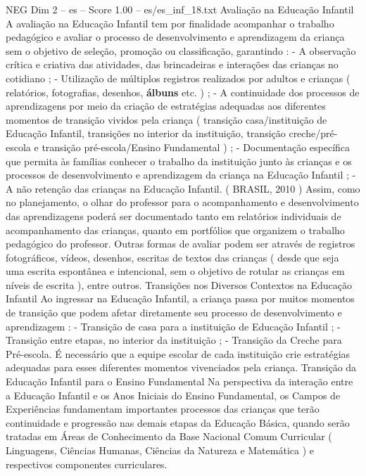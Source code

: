 \begin{textsample}{NEG Dim 2 – es – Score 1.00 – es/es\_inf\_18.txt}  \label{ex:f2_neg_080}
Avaliação na Educação Infantil A avaliação na Educação Infantil tem por finalidade acompanhar o trabalho pedagógico e avaliar o processo de desenvolvimento e aprendizagem da criança sem o objetivo de seleção, promoção ou classificação, garantindo : - A observação crítica e criativa das atividades, das brincadeiras e interações das crianças no cotidiano ; - Utilização de múltiplos registros realizados por adultos e crianças ( relatórios, fotografias, desenhos, \textbf{álbuns} etc. ) ; - A continuidade dos processos de aprendizagens por meio da criação de estratégias adequadas aos diferentes momentos de transição vividos pela criança ( transição casa/instituição de Educação Infantil, transições no interior da instituição, transição creche/pré-escola e transição pré-escola/Ensino Fundamental ) ; - Documentação específica que permita às famílias conhecer o trabalho da instituição junto às crianças e os processos de desenvolvimento e aprendizagem da criança na Educação Infantil ; - A não retenção das crianças na Educação Infantil. ( BRASIL, 2010 ) Assim, como no planejamento, o olhar do professor para o acompanhamento e desenvolvimento das aprendizagens poderá ser documentado tanto em relatórios individuais de acompanhamento das crianças, quanto em portfólios que organizem o trabalho pedagógico do professor.
Outras formas de avaliar podem ser através de registros fotográficos, vídeos, desenhos, escritas de textos das crianças ( desde que seja uma escrita espontânea e intencional, sem o objetivo de rotular as crianças em níveis de escrita ), entre outros.
Transições nos Diversos Contextos na Educação Infantil Ao ingressar na Educação Infantil, a criança passa por muitos momentos de transição que podem afetar diretamente seu processo de desenvolvimento e aprendizagem : - Transição de casa para a instituição de Educação Infantil ; - Transição entre etapas, no interior da instituição ; - Transição da Creche para Pré-escola.
É necessário que a equipe escolar de cada instituição crie estratégias adequadas para esses diferentes momentos vivenciados pela criança.
Transição da Educação Infantil para o Ensino Fundamental Na perspectiva da interação entre a Educação Infantil e os Anos Iniciais do Ensino Fundamental, os Campos de Experiências fundamentam importantes processos das crianças que terão continuidade e progressão nas demais etapas da Educação Básica, quando serão tratadas em Áreas de Conhecimento da Base Nacional Comum Curricular ( Linguagens, Ciências Humanas, Ciências da Natureza e Matemática ) e respectivos componentes curriculares.

\end{textsample}
